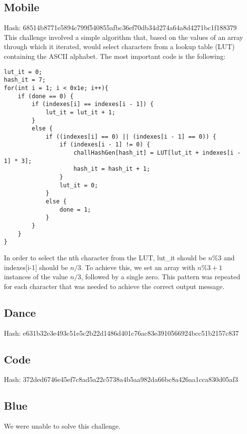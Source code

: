 \subsection{Mobile}
Hash: 68514b8771e5894c799f540855afbc36ef70db34d274a64a8d4271bc1f188379
This challenge involved a simple algorithm that, based on the values of an array through which it iterated, would select characters from a lookup table (LUT) containing the ASCII alphabet. The most important code is the following: 
\begin{lstlisting}
lut_it = 0;
hash_it = 7;
for(int i = 1; i < 0x1e; i++){
	if (done == 0) {
		if (indexes[i] == indexes[i - 1]) {
			lut_it = lut_it + 1;
		}
		else {
			if ((indexes[i] == 0) || (indexes[i - 1] == 0)) {
				if (indexes[i - 1] != 0) {
					challHashGen[hash_it] = LUT[lut_it + indexes[i - 1] * 3];
					hash_it = hash_it + 1;
				}
				lut_it = 0;
			}
			else {
				done = 1;
			}
		}
	}
}

\end{lstlisting}
In order to select the nth character from the LUT, lut_it should be $n\%3$ and indexes[i-1] should be $n/3$. To achieve this, we set an array with $n\%3+1$ instances of the value $n/3$, followed by a single zero. This pattern was repeated for each character that was needed to achieve the correct output message. 

\subsection{Dance}
Hash: e631b32e3e493c51e5c2b22d1486d401c76ac83e3910566924bcc51b2157c837

\subsection{Code}
Hash: 372ded6746e45ef7c8ad5a22c5738a4b5aa982da66bc8a426aa1cca830d05af3

\subsection{Blue}
We were unable to solve this challenge.
